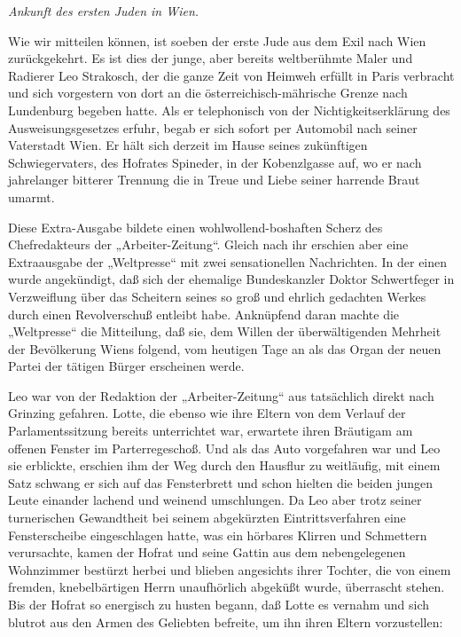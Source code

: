\begin{center}
\textit{Ankunft des ersten Juden in Wien.}

\end{center}
Wie wir mitteilen können, ist soeben der erste Jude aus dem Exil
nach Wien zurückgekehrt. Es ist dies der junge, aber bereits
weltberühmte Maler und Radierer Leo Strakosch, der die ganze Zeit
von Heimweh erfüllt in Paris verbracht und sich vorgestern von dort
an die österreichisch-mährische Grenze nach Lundenburg begeben
hatte. Als er telephonisch von der Nichtigkeitserklärung des
Ausweisungsgesetzes erfuhr, begab er sich sofort per Automobil nach
seiner Vaterstadt Wien. Er hält sich derzeit im Hause seines
zukünftigen Schwiegervaters, des Hofrates Spineder, in der
 Kobenzlgasse auf, wo er nach jahrelanger bitterer
Trennung die in Treue und Liebe seiner harrende Braut umarmt.

Diese Extra-Ausgabe bildete einen wohlwollend-boshaften Scherz des
Chefredakteurs der „Arbeiter-Zeitung“. Gleich nach ihr erschien
aber eine Extraausgabe der „Weltpresse“ mit zwei sensationellen
Nachrichten. In der einen wurde angekündigt, daß sich der ehemalige
Bundeskanzler Doktor Schwertfeger in Verzweiflung über das
Scheitern seines so groß und ehrlich gedachten Werkes durch einen
Revolverschuß entleibt habe. Anknüpfend daran machte die
„Weltpresse“ die Mitteilung, daß sie, dem Willen der
überwältigenden Mehrheit der Bevölkerung Wiens folgend, vom
heutigen Tage an als das Organ der neuen Partei der tätigen Bürger
erscheinen werde.

\tb{* * *}
Leo war von der Redaktion der „Arbeiter-Zeitung“ aus tatsächlich
direkt nach Grinzing gefahren. Lotte, die ebenso wie ihre Eltern
von dem Verlauf der Parlamentssitzung bereits unterrichtet war,
erwartete ihren Bräutigam am offenen Fenster im Parterregeschoß.
Und als das Auto vorgefahren war und Leo sie erblickte, erschien
ihm der Weg durch den Hausflur zu weitläufig, mit einem Satz
schwang er sich auf das Fensterbrett und schon hielten die beiden
jungen Leute einander lachend und weinend umschlungen. Da Leo aber
trotz seiner turnerischen Gewandtheit bei seinem abgekürzten
Eintrittsverfahren eine Fensterscheibe eingeschlagen hatte, was ein
hörbares Klirren und Schmettern verursachte, kamen der Hofrat und
seine Gattin aus dem  nebengelegenen Wohnzimmer
bestürzt herbei und blieben angesichts ihrer Tochter, die von einem
fremden, knebelbärtigen Herrn unaufhörlich abgeküßt wurde,
überrascht stehen. Bis der Hofrat so energisch zu husten begann,
daß Lotte es vernahm und sich blutrot aus den Armen des Geliebten
befreite, um ihn ihren Eltern vorzustellen:

